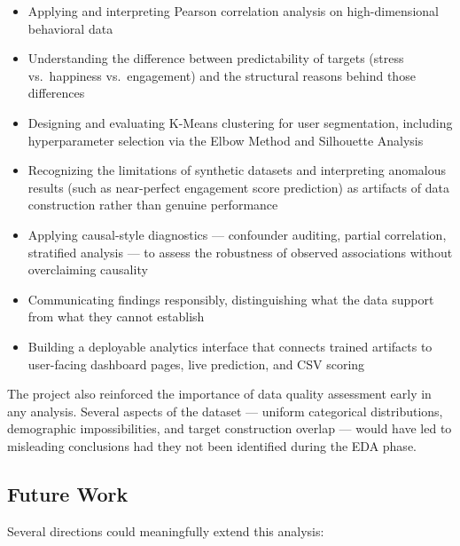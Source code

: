 \documentclass[12pt,a4paper]{article}
\begin{document}
\begin{itemize}
    \item Applying and interpreting Pearson correlation analysis on high-dimensional behavioral data
    \item Understanding the difference between predictability of targets (stress vs.\ happiness vs.\ engagement) and the structural reasons behind those differences
    \item Designing and evaluating K-Means clustering for user segmentation, including hyperparameter selection via the Elbow Method and Silhouette Analysis
    \item Recognizing the limitations of synthetic datasets and interpreting anomalous results (such as near-perfect engagement score prediction) as artifacts of data construction rather than genuine performance
    \item Applying causal-style diagnostics — confounder auditing, partial correlation, stratified analysis — to assess the robustness of observed associations without overclaiming causality
    \item Communicating findings responsibly, distinguishing what the data support from what they cannot establish
    \item Building a deployable analytics interface that connects trained artifacts to user-facing dashboard pages, live prediction, and CSV scoring
\end{itemize}
 
The project also reinforced the importance of data quality assessment early in any analysis. Several aspects of the dataset — uniform categorical distributions, demographic impossibilities, and target construction overlap — would have led to misleading conclusions had they not been identified during the EDA phase.

\subsection{Future Work}
Several directions could meaningfully extend this analysis:
 
\end{document}
